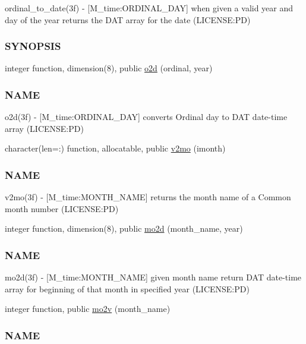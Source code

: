 \begin{DoxyCompactItemize}
\begin{DoxyCompactList}
ordinal\+\_\+to\+\_\+date(3f) -\/ \mbox{[}M\+\_\+time\+:O\+R\+D\+I\+N\+A\+L\+\_\+\+D\+AY\mbox{]} when given a valid year and day of the year returns the D\+AT array for the date (L\+I\+C\+E\+N\+SE\+:PD) \subsubsection*{S\+Y\+N\+O\+P\+S\+IS}\end{DoxyCompactList}\item 
integer function, dimension(8), public \mbox{\hyperlink{namespacem__time_a55e2cb9efc9d4d209ae2864f073d4f19}{o2d}} (ordinal, year)
\begin{DoxyCompactList}\small\item\em \subsubsection*{N\+A\+ME}

o2d(3f) -\/ \mbox{[}M\+\_\+time\+:O\+R\+D\+I\+N\+A\+L\+\_\+\+D\+AY\mbox{]} converts Ordinal day to D\+AT date-\/time array (L\+I\+C\+E\+N\+SE\+:PD) \end{DoxyCompactList}\item 
character(len=\+:) function, allocatable, public \mbox{\hyperlink{namespacem__time_a6f28cf00e4998bb50bb503f5e4bd3f77}{v2mo}} (imonth)
\begin{DoxyCompactList}\small\item\em \subsubsection*{N\+A\+ME}

v2mo(3f) -\/ \mbox{[}M\+\_\+time\+:M\+O\+N\+T\+H\+\_\+\+N\+A\+ME\mbox{]} returns the month name of a Common month number (L\+I\+C\+E\+N\+SE\+:PD) \end{DoxyCompactList}\item 
integer function, dimension(8), public \mbox{\hyperlink{namespacem__time_a8188c7ed4e592c4f2388d28c75486726}{mo2d}} (month\+\_\+name, year)
\begin{DoxyCompactList}\small\item\em \subsubsection*{N\+A\+ME}

mo2d(3f) -\/ \mbox{[}M\+\_\+time\+:M\+O\+N\+T\+H\+\_\+\+N\+A\+ME\mbox{]} given month name return D\+AT date-\/time array for beginning of that month in specified year (L\+I\+C\+E\+N\+SE\+:PD) \end{DoxyCompactList}\item 
integer function, public \mbox{\hyperlink{namespacem__time_ad7bf0886754757e8961e562f06cf3bb7}{mo2v}} (month\+\_\+name)
\begin{DoxyCompactList}\small\item\em \subsubsection*{N\+A\+ME}


\end{DoxyCompactList}
\end{DoxyCompactItemize}

